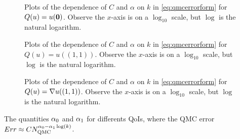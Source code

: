 \begin{figure}[h]
    \centering
  \begin{subfigure}{\textwidth}

  \end{subfigure}
    \begin{subfigure}{\textwidth}

    \end{subfigure}
\caption{Plots of the dependence of $C$ and $\alpha$ on $k$ in \cref{eq:qmcerrorform} for $Q(u) =  u(\mathbf{0})$. Observe the $x$-axis is on a $\log_{10}$ scale, but $\log$ is the natural logarithm. \label{fig:originCalpha}}
\end{figure}

\begin{figure}[h]
    \centering
  \begin{subfigure}{\textwidth}

  \end{subfigure}
    \begin{subfigure}{\textwidth}

    \end{subfigure}
\caption{Plots of the dependence of $C$ and $\alpha$ on $k$ in \cref{eq:qmcerrorform} for $Q(u) = u((1,1))$. Observe the $x$-axis is on a $\log_{10}$ scale, but $\log$ is the natural logarithm.  \label{fig:toprightCalpha}}
\end{figure}

\begin{figure}[h]
    \centering
  \begin{subfigure}{\textwidth}

  \end{subfigure}
    \begin{subfigure}{\textwidth}

    \end{subfigure}
\caption{Plots of the dependence of $C$ and $\alpha$ on $k$ in \cref{eq:qmcerrorform} for $Q(u) = \nabla u((1,1))$. Observe the $x$-axis is on a $\log_{10}$ scale, but $\log$ is the natural logarithm.  \label{fig:gradienttoprightCalpha}}
\end{figure}


\begin{table}[h]
  \centering
  
  \caption{The quantities $\alpha_{0}$ and $\alpha_{1}$ for differents QoIs, where the QMC error $Err \approx C N_{\mathrm{QMC}}^{\alpha_{0} - \alpha_{1}\log(k)}$.}\label{tab:qmcalpha}
  \end{table}

